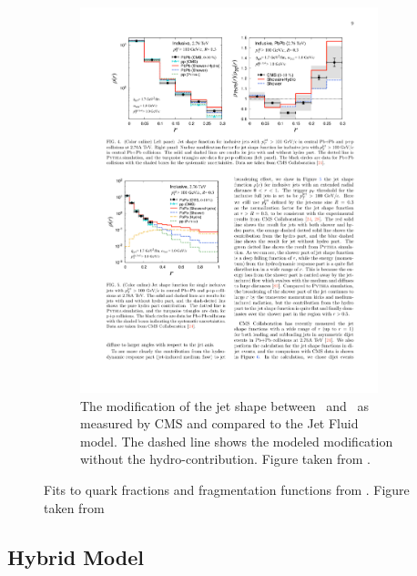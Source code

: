 \begin{figure}
\begin{subfigure}{.45\textwidth}
\includegraphics[width=0.95\textwidth]{figures/jetMeasurements/JF_jetShapeModification}
\caption{The modification of the jet shape between \pp\ and \pbpb\ as measured by CMS \cite{Chatrchyan:2013kwa} and compared to the Jet Fluid model. The dashed line shows the modeled modification without the hydro-contribution. Figure taken from \cite{Tachibana:2017syd}.}
\label{fig:jf_jetshapemod}
\end{subfigure}
\caption{Fits to quark fractions and fragmentation functions from .  Figure taken from \cite{Spousta:2015fca}}
\label{fig:JF_jetShapemodel}
\end{figure}





\subsection{Hybrid Model}














